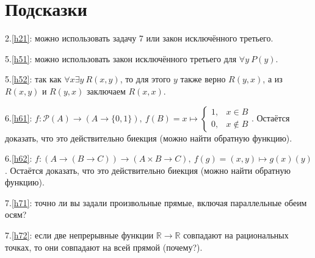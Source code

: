 \documentclass{article}
\newcommand{\R}{\mathbb{R}}
\begin{document}
\pagebreak
\section*{Подсказки}
\label{hints}

2.\ref{h21}: можно использовать задачу 7 или закон исключённого третьего.

5.\ref{h51}: можно использовать закон исключённого третьего для $\forall y~P(y)$.

5.\ref{h52}: так как $\forall x \exists y~R(x,y)$, то для этого $y$ также верно $R(y,x)$, а из $R(x,y)$ и $R(y,x)$ заключаем $R(x,x)$.

6.\ref{h61}: $f: \mathcal{P}(A) \to (A \to \{0,1\}),~f(B) = x \mapsto \begin{cases} 1, & x \in B \\ 0, & x \notin B \end{cases}$. Остаётся доказать, что это действительно биекция (можно найти обратную функцию).

6.\ref{h62}: $f: (A \to (B \to C)) \to (A \times B \to C),~f(g) = (x,y) \mapsto g(x)(y)$. Остаётся доказать, что это действительно биекция (можно найти обратную функцию).

7.\ref{h71}: точно ли вы задали произвольные прямые, включая параллельные обеим осям?

7.\ref{h72}: если две непрерывные функции $\R \to \R$ совпадают на рациональных точках, то они совпадают на всей прямой (почему?).
\end{document}
